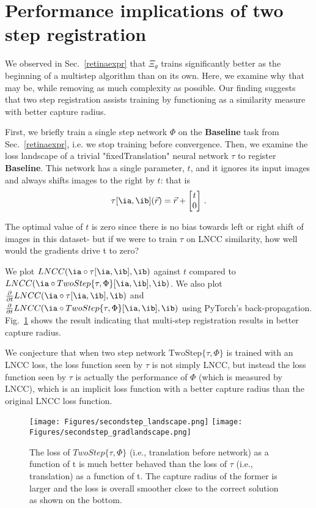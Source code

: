\section{Performance implications of two step registration}
We observed in Sec.~\ref{retinaexpr} that $\Xi_\theta$ trains significantly better as the beginning of a multistep algorithm than on its own. Here, we examine why that may be, while removing as much complexity as possible. Our finding suggests that two step registration assists training by functioning as a similarity
measure with better capture radius.

First, we briefly train a single step network $\Phi$ on the \textbf{Baseline} task from Sec.~\ref{retinaexpr}, i.e. we stop training before convergence. Then, we examine the loss
landscape of a trivial "fixedTranslation" neural network $\tau$ to
register \textbf{Baseline}. This network has a single parameter, $t$, and it ignores
its input images and always shifts images to the right by $t$: that is
\begin{equation}
	\tau[\ia, \ib](\vec{r}) = \vec{r} + \begin{bmatrix}t \\ 0\end{bmatrix}\,.
\end{equation}

The optimal value of $t$ is zero since there is no bias towards left or right
shift of images in this dataset- but if we were to train $\tau$ on LNCC similarity, how well would the gradients drive t to zero?

We plot $LNCC(\ia \circ \tau[\ia, \ib], \ib)$ against $t$ compared to $LNCC(\ia
	\circ TwoStep\{\tau, \Phi\}[\ia, \ib], \ib)$. We also plot
$\frac{\partial}{\partial t} LNCC(\ia \circ \tau[\ia, \ib], \ib)$ and
$\frac{\partial}{\partial t}LNCC(\ia \circ TwoStep\{\tau, \Phi\}[\ia, \ib],
	\ib)$ using PyTorch's back-propagation. Fig.~\ref{fig:landscapces} shows the result indicating that multi-step registration results in better capture radius.

We conjecture that when two step network $\text{TwoStep}\{\tau, \Phi\}$ is trained with an LNCC loss, the loss function seen by $\tau$ is not simply LNCC, but instead the loss function seen by $\tau$ is actually the
performance of $\Phi$ (which is measured by LNCC), which is an implicit loss function with a better capture
radius than the original LNCC loss function.

\begin{figure}[htp]
	\centering
	\texttt{[image: Figures/secondstep\_landscape.png]}
	\texttt{[image: Figures/secondstep\_gradlandscape.png]}
	\caption{The loss of $TwoStep\{\tau, \Phi\}$ (i.e., translation before network) as a function of t is much better behaved than the loss of $\tau$ (i.e., translation) as a function of t. The capture radius of the former is larger and the loss is overall smoother close to the correct solution as shown on the bottom.}
	\label{fig:landscapces}
\end{figure}

